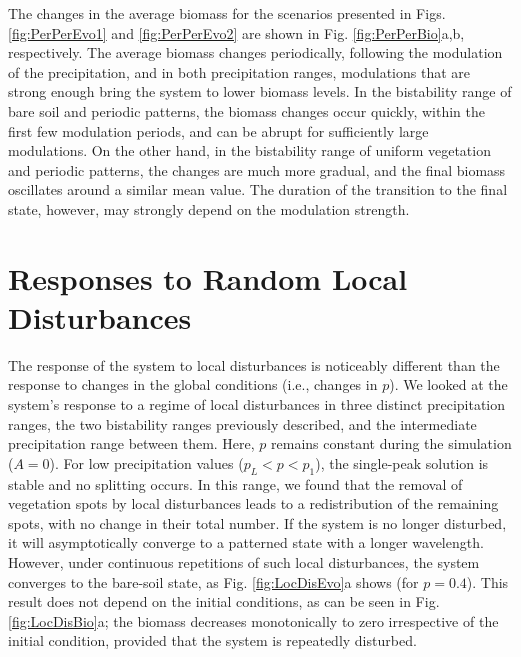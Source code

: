 \documentclass[aps,prl,preprint,superscriptaddress,floatfix]{revtex4-1}
\begin{document}
The changes in the average biomass for the scenarios presented in Figs. \ref{fig:PerPerEvo1} and \ref{fig:PerPerEvo2} are shown in Fig. \ref{fig:PerPerBio}a,b, respectively.
The average biomass changes periodically, following the modulation of the precipitation, and in both precipitation ranges, modulations that are strong enough bring the system to lower biomass levels.
In the bistability range of bare soil and periodic patterns, the biomass changes occur quickly, within the first few modulation periods, and can be abrupt for sufficiently large modulations.
On the other hand, in the bistability range of uniform vegetation and periodic patterns, the changes are much more gradual, and the final biomass oscillates around a similar mean value. 
The duration of the transition to the final state, however, may strongly depend on the modulation strength.

\section{Responses to Random Local Disturbances} \label{locdis}
The response of the system to local disturbances is noticeably different than the response to changes in the global conditions (i.e., changes in $p$).
We looked at the system's response to a regime of local disturbances in three distinct precipitation ranges, the two bistability ranges previously described, and the intermediate precipitation range between them. 
Here, $p$ remains constant during the simulation ($A=0$).
For low precipitation values ($p_L<p<p_1$), the single-peak solution is stable and no splitting occurs. 
In this range, we found that the removal of vegetation spots by local disturbances leads to a redistribution of the remaining spots, with no change in their total number. 
If the system is no longer disturbed, it will asymptotically converge to a patterned state with a longer wavelength. 
However, under continuous repetitions of such local disturbances, the system converges to the bare-soil state, as Fig. \ref{fig:LocDisEvo}a shows (for $p=0.4$).
This result does not depend on the initial conditions, as can be seen in Fig. \ref{fig:LocDisBio}a; the biomass decreases monotonically to zero irrespective of the initial condition, provided that the system is repeatedly disturbed. 
\end{document}
